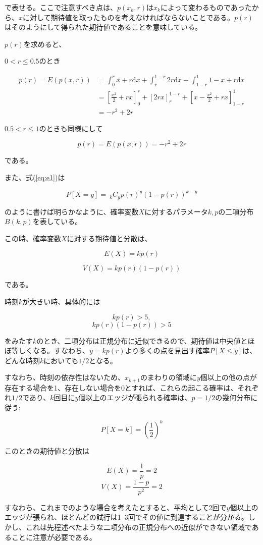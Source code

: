 で表せる。ここで注意すべき点は、$p(x_{k}, r)$は$x_{k}$によって変わるものであったから、$x$に対して期待値を取ったものを考えなければならないことである。$p(r)$はそのようにして得られた期待値であることを意味している。

$p(r)$を求めると、

$0<r\le0.5$のとき

\begin{align}p(r) = E(p(x, r)) &= \int^{r}_{0}x+r\mathrm{d}x + \int^{1-r}_{r}2r \mathrm{d}x + \int^{1}_{1-r} 1-x+r \mathrm{d}x\\
&= \left[\frac{x^{2}}{2} + rx \right]^{r}_{0} + \left[ 2rx\right]^{1-r}_{r}+ \left[ x-\frac{x^{2}}{2} + rx\right]^{1}_{1-r}\\
&= -r^{2} + 2r \end{align}

$0.5<r\le1$のときも同様にして

$$p(r) = E(p(x,r)) = -r^{2} + 2r$$

である。

また、式(\ref{eq:e1})は

$$P[X=y] =\ _{k}C_{y}p(r)^{y}(1-p(r))^{k-y}$$

のように書けば明らかなように、確率変数$X$に対するパラメータ$k,p$の二項分布$B(k,p)$を表している。

この時、確率変数$X$に対する期待値と分散は、

$$E(X) = kp(r)$$

$$V(X) = kp(r)(1-p(r))$$

である。

時刻$k$が大きい時、具体的には

$$kp(r) > 5,$$
$$kp(r)(1-p(r)) > 5$$

をみたす$k$のとき、二項分布は正規分布に近似できるので、期待値は中央値とほぼ等しくなる。すなわち、$y=kp(r)$より多くの点を見出す確率$P[X\le y]$は、どんな時刻$k$においても$1/2$となる。

すなわち、時刻の依存性はないため、$x_{k+1}$のまわりの領域に$y$個以上の他の点が存在する場合を1、存在しない場合を0とすれば、これらの起こる確率は、それぞれ$1/2$であり、$k$回目に$y$個以上のエッジが張られる確率は、$p=1/2$の幾何分布に従う:

$$P[X=k] = \left( \frac{1}{2} \right)^{k}$$

このときの期待値と分散は

$$E(X) = \frac{1}{p} = 2$$
$$V(X) = \frac{1-p}{p^{2}} = 2$$

すなわち、これまでのような場合を考えたとすると、平均として2回で$y$個以上のエッジが張られ、ほとんどの試行は1~3回でその値に到達することが分かる。しかし、これは先程述べたような二項分布の正規分布への近似ができない領域であることに注意が必要である。

